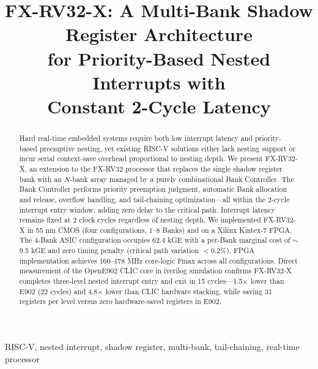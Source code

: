 \documentclass[conference]{IEEEtran}
\begin{document}
\title{FX-RV32-X: A Multi-Bank Shadow Register Architecture\\ for Priority-Based Nested Interrupts with \\ Constant 2-Cycle Latency}

\author{
}

\maketitle

\begin{abstract}
Hard real-time embedded systems require both low interrupt latency and priority-based preemptive nesting, yet existing RISC-V solutions either lack nesting support or incur serial context-save overhead proportional to nesting depth.
We present FX-RV32-X, an extension to the FX-RV32 processor that replaces the single shadow register bank with an $N$-bank array managed by a purely combinational Bank Controller.
The Bank Controller performs priority preemption judgment, automatic Bank allocation and release, overflow handling, and tail-chaining optimization---all within the 2-cycle interrupt entry window, adding zero delay to the critical path.
Interrupt latency remains fixed at 2 clock cycles regardless of nesting depth.
We implemented FX-RV32-X in 55 nm CMOS (four configurations, 1--8 Banks) and on a Xilinx Kintex-7 FPGA.
The 4-Bank ASIC configuration occupies 62.4 kGE with a per-Bank marginal cost of $\sim$9.5 kGE and zero timing penalty (critical path variation $<$0.2\%).
FPGA implementation achieves 160--178 MHz core-logic Fmax across all configurations.
Direct measurement of the OpenE902 CLIC core in iverilog simulation confirms FX-RV32-X completes three-level nested interrupt entry and exit in 15 cycles---1.5$\times$ lower than E902 (22 cycles) and 4.8$\times$ lower than CLIC hardware stacking, while saving 31 registers per level versus zero hardware-saved registers in E902.
\end{abstract}

\begin{IEEEkeywords}
RISC-V, nested interrupt, shadow register, multi-bank, tail-chaining, real-time processor
\end{IEEEkeywords}
\end{document}
